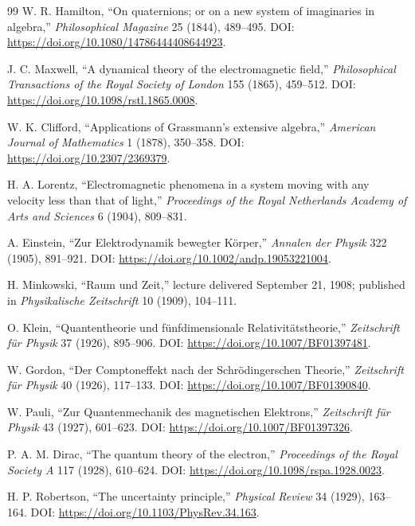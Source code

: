 \documentclass[10pt,letterpaper]{article}
\begin{document}
{}
\begingroup
\small
\begin{thebibliography}{99}
W. R. Hamilton, ``On quaternions; or on a new system of imaginaries in algebra,'' \emph{Philosophical Magazine} 25 (1844), 489--495. DOI: \url{https://doi.org/10.1080/14786444408644923}.

J. C. Maxwell, ``A dynamical theory of the electromagnetic field,'' \emph{Philosophical Transactions of the Royal Society of London} 155 (1865), 459--512. DOI: \url{https://doi.org/10.1098/rstl.1865.0008}.

W. K. Clifford, ``Applications of Grassmann's extensive algebra,'' \emph{American Journal of Mathematics} 1 (1878), 350--358. DOI: \url{https://doi.org/10.2307/2369379}.

H. A. Lorentz, ``Electromagnetic phenomena in a system moving with any velocity less than that of light,'' \emph{Proceedings of the Royal Netherlands Academy of Arts and Sciences} 6 (1904), 809--831.

A. Einstein, ``Zur Elektrodynamik bewegter K\"orper,'' \emph{Annalen der Physik} 322 (1905), 891--921. DOI: \url{https://doi.org/10.1002/andp.19053221004}.

H. Minkowski, ``Raum und Zeit,'' lecture delivered September 21, 1908; published in \emph{Physikalische Zeitschrift} 10 (1909), 104--111.

O. Klein, ``Quantentheorie und f\"unfdimensionale Relativit\"atstheorie,'' \emph{Zeitschrift f\"ur Physik} 37 (1926), 895--906. DOI: \url{https://doi.org/10.1007/BF01397481}.

W. Gordon, ``Der Comptoneffekt nach der Schr\"odingerschen Theorie,'' \emph{Zeitschrift f\"ur Physik} 40 (1926), 117--133. DOI: \url{https://doi.org/10.1007/BF01390840}.

W. Pauli, ``Zur Quantenmechanik des magnetischen Elektrons,'' \emph{Zeitschrift f\"ur Physik} 43 (1927), 601--623. DOI: \url{https://doi.org/10.1007/BF01397326}.

P. A. M. Dirac, ``The quantum theory of the electron,'' \emph{Proceedings of the Royal Society A} 117 (1928), 610--624. DOI: \url{https://doi.org/10.1098/rspa.1928.0023}.

H. P. Robertson, ``The uncertainty principle,'' \emph{Physical Review} 34 (1929), 163--164. DOI: \url{https://doi.org/10.1103/PhysRev.34.163}.


\end{thebibliography}
\end{document}
